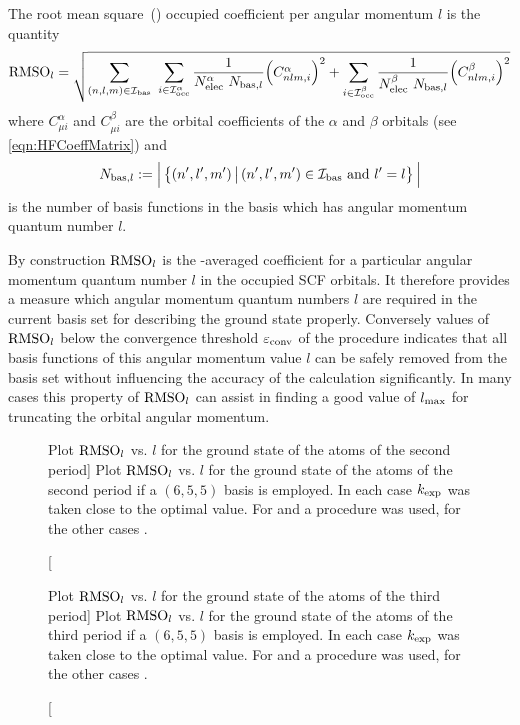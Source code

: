 \defineabbr{RMS}{RMS\xspace}{Root mean square}
\begin{defn}
	\label{defn:RMSOl}
	The root mean square~(\RMS) occupied coefficient per angular momentum $l$
	is the quantity
	\begin{equation}
	\text{RMSO}_l =
		\sqrt{
		\sum_{(n,l,m) \in \mathcal{I}_\text{bas}} \
		\sum_{i \in \mathcal{I}_\text{occ}^\alpha} \frac{1}{N_\text{elec}^\alpha \ N_{\text{bas}, l}}
			\Big(C^\alpha_{nlm, i} \Big)^2
			+ \sum_{i \in \mathcal{I}_\text{occ}^\beta} \frac{1}{N_\text{elec}^\beta \ N_{\text{bas}, l}}
			\Big( C^\beta_{nlm, i} \Big)^2
		}
		\label{eqn:DefRMSOl}
	\end{equation}
	where $C^\alpha_{\mu i}$ and $C^\beta_{\mu i}$
	are the orbital coefficients of the $\alpha$ and $\beta$ orbitals
	(see \eqref{eqn:HFCoeffMatrix})
	and
	\[
		N_{\text{bas}, l} := \Big| \left\{ (n',l',m') \, \big|\, (n',l',m') \in \mathcal{I}_\text{bas}
			\ \text{and} \ l' = l \right\} \Big|
	\]
	is the number of basis functions in the \CS basis which has angular momentum
	quantum number $l$.
\end{defn}

By construction $\text{RMSO}_l$ is the \RMS-averaged coefficient for a particular angular
momentum quantum number $l$ in the occupied SCF orbitals.
It therefore provides a measure which angular momentum quantum numbers $l$
are required in the current basis set for describing the ground state properly.
Conversely values of $\text{RMSO}_l$ below the convergence threshold $\varepsilon_\text{conv}$
of the \SCF procedure indicates that all \CS basis functions of this angular momentum
value $l$ can be safely removed from the \CS basis set without
influencing the accuracy of the \HF calculation significantly.
In many cases this property of $\text{RMSO}_l$ can assist in finding a good
value of $l_\text{max}$ for truncating the orbital angular momentum.

\begin{figure}[p]
	\centering
	\caption
	[Plot $\text{RMSO}_l$ vs. $l$ for the \HF ground state of the atoms of the second period]
	{
		Plot $\text{RMSO}_l$ vs. $l$ for the \HF ground state
		of the atoms of the second period
		if a $(6,5,5)$ \CS basis is employed.
		In each case $k_\text{exp}$ was taken close to the optimal value.
		For  and  a \RHF procedure was used,
		for the other cases \UHF.
	}
	\label{fig:RMSOl_period2}
\end{figure}
\begin{figure}[p]
	\centering
	\caption
	[Plot $\text{RMSO}_l$ vs. $l$ for the \HF ground state of the atoms of the third period]
	{
		Plot $\text{RMSO}_l$ vs. $l$ for the \HF ground state
		of the atoms of the third period
		if a $(6,5,5)$ \CS basis is employed.
		In each case $k_\text{exp}$ was taken close to the optimal value.
		For  and  a \RHF procedure was used,
		for the other cases \UHF.
	}
	\label{fig:RMSOl_period3}
\end{figure}

